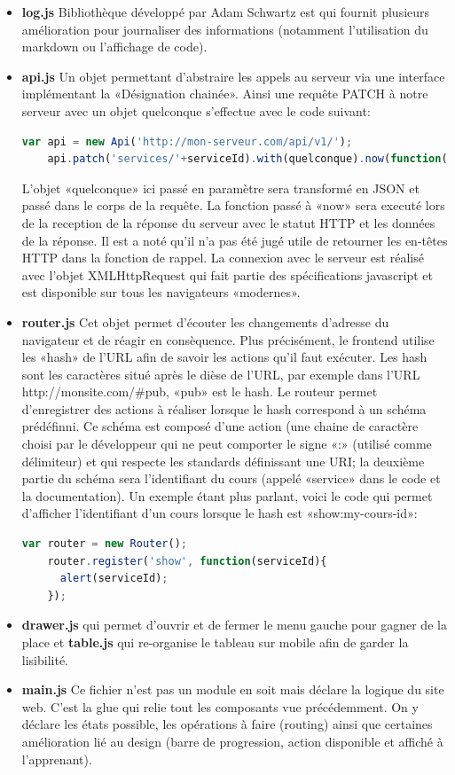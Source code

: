 \documentclass[a4paper,11pt]{report}
\begin{document}
\begin{itemize}
  \item \textbf{log.js} Bibliothèque développé par Adam Schwartz est qui fournit plusieurs amélioration pour journaliser des informations (notamment l'utilisation du markdown ou l'affichage de code).
  \item \textbf{api.js} Un objet permettant d'abstraire les appels au serveur via une interface implémentant la «Désignation chainée». Ainsi une requête PATCH à notre serveur avec un objet quelconque s'effectue avec le code suivant:
    \begin{lstlisting}[language=javascript,caption={Requête PATCH à l'api}]
    var api = new Api('http://mon-serveur.com/api/v1/');
    api.patch('services/'+serviceId).with(quelconque).now(function(status, data){});
    \end{lstlisting}
    L'objet «quelconque» ici passé en paramètre sera transformé en JSON et passé dans le corps de la requête. La fonction passé à «now» sera executé lors de la reception de la réponse du serveur avec le statut HTTP et les données de la réponse. Il est a noté qu'il n'a pas été jugé utile de retourner les en-têtes HTTP dans la fonction de rappel. La connexion avec le serveur est réalisé avec l'objet XMLHttpRequest qui fait partie des spécifications javascript et est disponible sur tous les navigateurs «modernes».
  \item \textbf{router.js} Cet objet permet d'écouter les changements d'adresse du navigateur et de réagir en consèquence. Plus précisément, le frontend utilise les «hash» de l'URL afin de savoir les actions qu'il faut exécuter. Les hash sont les caractères situé après le dièse de l'URL, par exemple dans l'URL http://monsite.com/\#pub, «pub» est le hash.
  Le routeur permet d'enregistrer des actions à réaliser lorsque le hash correspond à un schéma prédéfinni. Ce schéma est composé d'une action (une chaine de caractère choisi par le développeur qui ne peut comporter le signe «:» (utilisé comme délimiteur) et qui respecte les standards définissant une URI; la deuxième partie du schéma sera l'identifiant du cours (appelé «service» dans le code et la documentation).
  Un exemple étant plus parlant, voici le code qui permet d'afficher l'identifiant d'un cours lorsque le hash est «show:my-cours-id»:
    \begin{lstlisting}[language=javascript,caption={Affichage identifiant avec le routeur}]
    var router = new Router();
    router.register('show', function(serviceId){
      alert(serviceId);
    });
    \end{lstlisting}
  \item \textbf{drawer.js} qui permet d'ouvrir et de fermer le menu gauche pour gagner de la place et \textbf{table.js} qui re-organise le tableau sur mobile afin de garder la lisibilité.
  \item \textbf{main.js} Ce fichier n'est pas un module en soit mais déclare la logique du site web. C'est la glue qui relie tout les composants vue précédemment. On y déclare les états possible, les opérations à faire (routing) ainsi que certaines amélioration lié au design (barre de progression, action disponible et affiché à l'apprenant).
\end{itemize}
\end{document}
